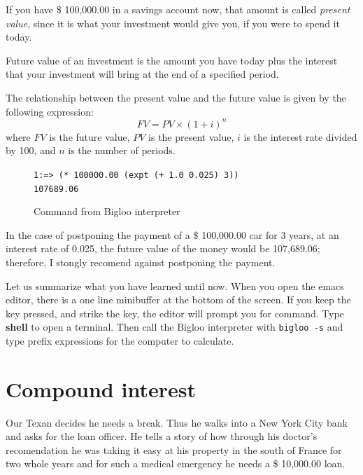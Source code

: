 \documentclass[a4paper,12pt]{book}
\newenvironment{fmpage}[1]
           {\begin{lrbox}{\fmbox}\begin{minipage}{#1}}
           {\end{minipage}\end{lrbox}\fbox{\usebox{\fmbox}}}
\begin{document}
If you have \$ 100,000.00 in a savings account
now, that amount is called {\em present value},
since it is what your investment would give you,
if you were to spend it today.

Future value of an investment is the amount
you have today plus the interest that your
investment will bring at the end of a
specified period.

The relationship between the present value
and the future value is given by the
following expression:
\begin{equation}
FV= PV\times (1+i)^n
\label{eq:future-value}
\end{equation}
where $FV$ is the future value, $PV$ is the present
value, $i$ is the interest rate divided by 100,
and $n$ is the number of periods.

\begin{figure}[!h]
\begin{fmpage}{0.8\textwidth}
\verb|1:=> (* 100000.00 (expt (+ 1.0 0.025) 3))|\\
\verb|107689.06|
\end{fmpage}
\caption{Command from Bigloo interpreter}
\label{future-value}
\end{figure}

In the case of postponing the payment of a \$ 100,000.00 car
for 3 years, at an interest rate of 0.025, the future
value of the money would be 107,689.06; therefore,
I stongly recomend against postponing the payment.

Let us summarize what you have learned until now.
When you open the emacs editor, there is
a one line minibuffer at the bottom of the screen.
If you keep the  key pressed,
and strike the   key, the editor
will prompt you for command. Type {\bf shell}
to open a terminal. Then call the Bigloo interpreter
with \verb|bigloo -s| and type prefix expressions
for the computer to calculate.


\section{Compound interest}

Our Texan decides he needs a break. Thus he walks into
a New York City bank and asks for the loan officer.
He tells a story of how through his doctor's recomendation
he was taking it easy at his property in the south of
France for two whole years and for such a medical
emergency he needs a \$ 10,000.00 loan.
\end{document}
